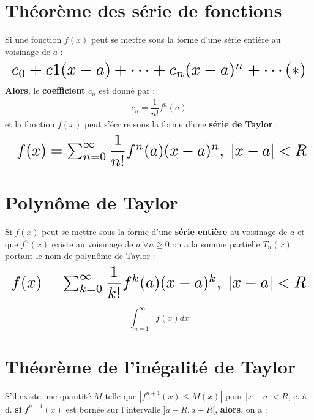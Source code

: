 \documentclass{report}
\begin{document}
\begin{multicols*}{3}
    \section{Théorème des série de fonctions}
        Si une fonction \( f(x) \) peut se mettre sous la forme d'une série entière 
        au voisinage de \( a \) :
        \begin{align*}
        \resizebox{\linewidth}{!}{$
            c_0 + c1(x - a) +  \cdots + c_n (x - a)^n + \cdots (*)
        $}
        \end{align*}
        \textbf{Alors}, le \textcolor{myb}{\textbf{coefficient }} 
        \( c_n \) est donné par : 
        \begin{align*}
            c_n = \dfrac{1}{n!}f^{n}(a) 
        \end{align*}
        et la fonction \( f(x) \) peut s'écrire sous la forme d'une 
        \textcolor{myb}{\textbf{série de Taylor }}: 
        \begin{align*}
            \resizebox{\linewidth}{!}{ $
            f(x) = \sum_{n= 0}^{\infty }\dfrac{1}{n!}f^{n}(a)(x - a)^n, \; |x - a| < R 
        $}
        \end{align*}

    \section{Polynôme de Taylor}
    Si \( f(x) \) peut se mettre sous la forme d'une \textbf{série entière} au voisinage de 
    \( a \) et que \( f^{n}(x) \) existe au voisinage de \( a  \; \forall n \geq 0\) on 
    a la somme partielle \( T_n(x) \) portant le nom de polynôme de Taylor : 
    \begin{align*}
        \resizebox{\linewidth}{!}{$
            f(x) = \sum_{k=0}^{\infty }\dfrac{1}{k!}f^{k}(a)(x - a)^k, \; |x - a| < R
        $}
    \end{align*}            

    $$\int_{n=1}^{\infty }f(x)dx$$

     \section{Théorème de l'inégalité de Taylor}

     S'il existe une quantité $M$ telle que 
     $\left| f^{n+1}(x) \leq M(x) \right|$ pour 
     $|x - a| < R$, c.-à-d. \textbf{si}  
     $f^{n+1}(x)$ est bornée sur l'intervalle 
     $]a - R, a + R[$, \textbf{alors}, on a : 


\end{multicols*}
\end{document}
